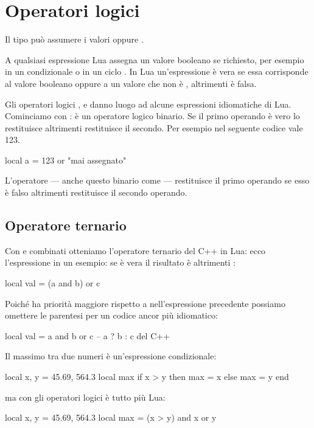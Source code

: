 

\chapter{Operatori logici}
\label{iiChOpLogic}

Il tipo  può assumere i valori 
oppure .

A qualsiasi espressione Lua assegna un valore booleano se richiesto, per esempio
in un condizionale  o in un ciclo . In
Lua un'espressione è vera se essa corrisponde al valore booleano
 oppure a un valore che non è ,
altrimenti è falsa.

Gli operatori logici ,  e
 danno luogo ad alcune espressioni idiomatiche di Lua.
Cominciamo con : è un operatore logico binario. Se il primo operando è
vero lo restituisce altrimenti restituisce il secondo. Per esempio nel seguente
codice  vale 123.
\begin{lines}
local a = 123 or "mai assegnato"
\end{lines}

L'operatore  --- anche questo binario come  --- restituisce il
primo operando se esso è falso altrimenti restituisce il secondo operando.

\section{Operatore ternario}
\label{iiSecOperatoreTernario}

Con  e  combinati otteniamo l'operatore ternario del C++ in
Lua: ecco l'espressione in un esempio: se  è vera il risultato è 
altrimenti :
\begin{lines}
local val = (a and b) or c
\end{lines}

Poiché  ha priorità maggiore rispetto a  nell'espressione
precedente possiamo omettere le parentesi per un codice ancor più idiomatico:
\begin{lines}
local val = a and b or c -- a ? b : c del C++
\end{lines}

Il massimo tra due numeri è un'espressione condizionale:
\begin{lines}
local x, y = 45.69, 564.3
local max
if x > y then
    max = x
else
    max = y
end
\end{lines}
ma con gli operatori logici è tutto più Lua:
\begin{lines}
local x, y = 45.69, 564.3
local max = (x > y) and x or y
\end{lines}

